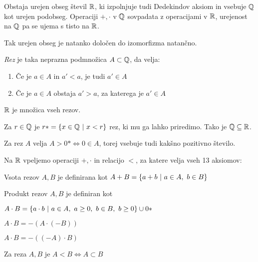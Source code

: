 \documentclass[12pt, a4paper]{article}
\begin{document}
\begin{izrek}
Obstaja urejen obseg števil $\mathbb{R}$, ki izpolnjuje tudi Dedekindov aksiom in vsebuje $\mathbb{Q}$ kot urejen podobseg. Operaciji $+,\cdot$ v $\mathbb{Q}$ sovpadata z operacijami v $\mathbb{R}$, urejenost na $\mathbb{Q}$ pa se ujema s tisto na $\mathbb{R}$.
\end{izrek}

\begin{opomba}
Tak urejen obseg je natanko določen do izomorfizma natančno.
\end{opomba}

\begin{definicija}
\emph{Rez} je taka neprazna podmnožica $A\subset\mathbb{Q}$, da velja:

\begin{enumerate}[label=\arabic*)]
\item Če je $a\in A$ in $a'<a$, je tudi $a'\in A$
\item Če je $a\in A$ obstaja $a'>a$, za katerega je $a'\in A$
\end{enumerate}

$\mathbb{R}$ je množica vseh rezov.
\end{definicija}

\begin{zgled}
Za $r\in\mathbb{Q}$ je $r*=\left\{x\in\mathbb{Q}~\middle\vert~x<r\right\}$ rez, ki mu ga lahko priredimo. Tako je $\mathbb{Q}\subseteq\mathbb{R}$.
\end{zgled}

\begin{opomba}
Za rez $A$ velja $A>0*\iff 0\in A$, torej vsebuje tudi kakšno pozitivno število.
\end{opomba}

\begin{definicija}
Na $\mathbb{R}$ vpeljemo operaciji $+,\cdot$ in relacijo $<$, za katere velja vseh 13 aksiomov:

\begin{description}[font=\normalfont, align=left, labelwidth=3cm]
\item[$\bullet$ Operacija $+$] Vsota rezov $A,B$ je definirana kot $A+B=\left\{a+b~\middle\vert~a\in A,~b\in B\right\}$
\item[$\bullet$ Operacija $\cdot$] Produkt rezov $A,B$ je definiran kot

\begin{description}[font=\normalfont, align=left, labelwidth=3.5cm]
\item [a) $A,B>0$] $A\cdot B=\left\{a\cdot b~\middle\vert~a\in A,~a\geq 0,~b\in B,~b\geq 0\right\}\cup 0*$
\item[b) $A>0,B<0$] $A\cdot B=-(A\cdot(-B))$
\item [c) $A<0$] $A\cdot B=-((-A)\cdot B)$
\end{description}
\item[$\bullet$ Relacija $<$] Za reza $A,B$ je $A<B\iff A\subset B$
\end{description}
\end{definicija}
\end{document}
